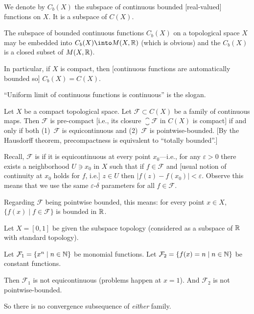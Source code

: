 \begin{node}
We denote by $C_{b}(X)$ the subspace of continuous bounded
[real-valued] functions on $X$. It is a subspace of $C(X)$.
\end{node}

\begin{theorem}
The subspace of bounded continuous functions $C_{b}(X)$ on a
topological space $X$ may be embedded into $C_{b}(X)\into M(X,\RR)$
(which is obvious) and the $C_{b}(X)$ is a closed subset of $M(X,\mathbb{R})$.

In particular, if $X$ is compact, then [continuous functions are
  automatically bounded so] $C_{b}(X)=C(X)$.
\end{theorem}

``Uniform limit of continuous functions is continuous'' is the slogan.

\begin{theorem}
Let $X$ be a compact topological space. Let $\mathcal{F}\subset C(X)$
be a family of continuous maps.
Then $\mathcal{F}$ is pre-compact [i.e., its closure
  $\closure{\mathcal{F}}$ in $C(X)$ is compact] if and only if both
(1)~$\mathcal{F}$ is equicontinuous and (2)~$\mathcal{F}$ is pointwise-bounded.
[By the Hausdorff theorem, precompactness is equivalent to ``totally bounded''.]
\end{theorem}

\begin{remark}
Recall, $\mathcal{F}$ is  if it is
equicontinuous at every point $x_{0}$---i.e., for any $\varepsilon>0$
there exists a neighborhood $U\ni x_{0}$ in $X$ such that if
$f\in\mathcal{F}$ and [usual notion of continuity at $x_{0}$ holds for
  $f$, i.e.] $z\in U$ then $|f(z)-f(x_{0})|<\varepsilon$.
Observe this means that we use the same $\varepsilon$-$\delta$
parameters for all $f\in\mathcal{F}$.
\end{remark}

\begin{remark}
Regarding $\mathcal{F}$ being pointwise bounded, this means: for every
point $x\in X$, $\{f(x)\mid f\in\mathcal{F}\}$ is bounded in $\mathbb{R}$.
\end{remark}

\begin{example}
Let $X=[0,1]$ be given the subspace topology (considered as a subspace
of $\mathbb{R}$ with standard topology). 

Let $\mathcal{F}_{1}=\{x^{n}\mid n\in\mathbb{N}\}$ be monomial functions. Let
$\mathcal{F}_{2}=\{f(x)=n\mid n\in\mathbb{N}\}$ be constant functions.

Then $\mathcal{F}_{1}$ is not equicontinuous (problems happen at
$x=1$).
And $\mathcal{F}_{2}$ is not pointwise-bounded.

So there is no convergence subsequence of \emph{either} family.
\end{example}

